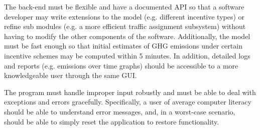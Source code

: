 The back-end must be flexible and have a documented API so that a
software developer may write extensions to the model (e.g. different
incentive types) or refine sub modules (e.g. a more efficient traffic
assignment subsystem) without having to modify the other components of
the software. Additionally, the model must be fast enough so that
initial estimates of GHG emissions under certain incentive schemes may
be computed within 5 minutes. In addition, detailed logs and reports
(e.g. emissions over time graphs) should be accessible to a more
knowledgeable user through the same GUI.

The program must handle improper input robustly and must be able to
deal with exceptions and errors gracefully. Specifically, a user of
average computer literacy should be able to understand error messages,
and, in a worst-case scenario, should be able to simply reset the
application to restore functionality.

